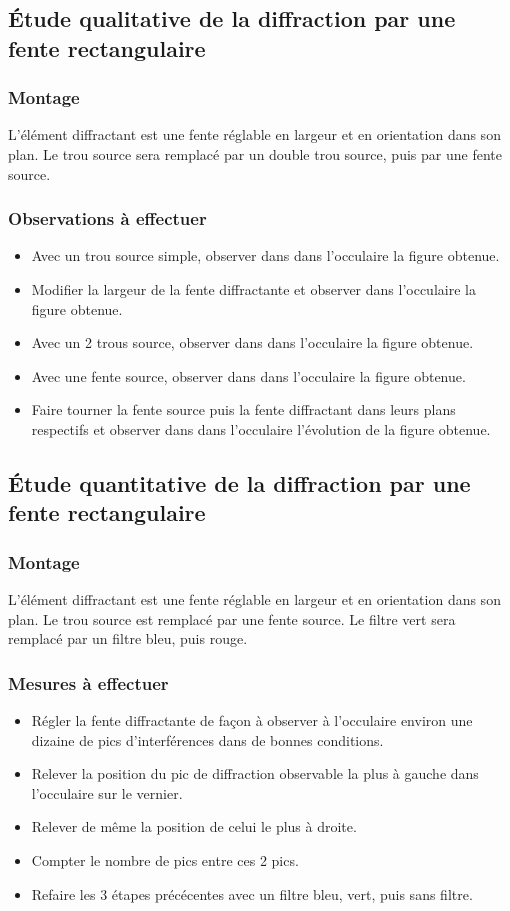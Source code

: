 \documentclass[a4paper,9pt,french]{scrartcl}
\begin{document}
\subsection{Étude qualitative de la diffraction par une fente rectangulaire}
\subsubsection{Montage}
L'élément diffractant est une fente réglable en largeur et en orientation dans son plan. Le trou source sera remplacé par un double trou source, puis par une fente source.
\subsubsection{Observations à effectuer}
\begin{itemize}
 \item Avec un trou source simple, observer dans dans l'occulaire la figure obtenue.
 \item Modifier la largeur de la fente diffractante et observer dans l'occulaire la figure obtenue.
 \item Avec un 2 trous source, observer dans dans l'occulaire la figure obtenue.
  \item Avec une fente source, observer dans dans l'occulaire la figure obtenue.
  \item Faire tourner la fente source puis la fente diffractant dans leurs plans respectifs et observer dans dans l'occulaire l'évolution de la figure obtenue.
\end{itemize}
\subsection{Étude quantitative de la diffraction par une fente rectangulaire}
\subsubsection{Montage}
L'élément diffractant est une fente réglable en largeur et en orientation dans son plan. Le trou source est remplacé par une fente source. Le filtre vert sera remplacé par un filtre bleu, puis rouge.
\subsubsection{Mesures à effectuer}
\begin{itemize}
 \item Régler la fente diffractante de façon à observer à l'occulaire environ une dizaine de pics d'interférences dans de bonnes conditions.
 \item Relever la position du pic de diffraction observable la plus à gauche dans l'occulaire sur le vernier.
 \item Relever de m\^eme la position de celui le plus à droite.
 \item Compter le nombre de pics entre ces 2 pics.
 \item Refaire les 3 étapes précécentes avec un filtre bleu, vert, puis sans filtre.
\end{itemize}
\end{document}
